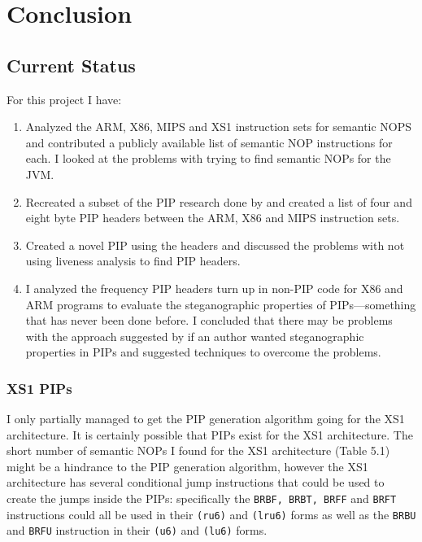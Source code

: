 \documentclass[10pt,]{book}
\begin{document}
\chapter{Conclusion}

\section{Current Status}

For this project I have:

\begin{enumerate}[1.]
\item
  Analyzed the ARM, X86, MIPS and XS1 instruction sets for semantic NOPS
  and contributed a publicly available list of semantic NOP instructions
  for each. I looked at the problems with trying to find semantic NOPs
  for the JVM.
\item
  Recreated a subset of the PIP research done by \autocite{Cha:2010uh}
  and created a list of four and eight byte PIP headers between the ARM,
  X86 and MIPS instruction sets.
\item
  Created a novel PIP using the headers and discussed the problems with
  not using liveness analysis to find PIP headers.
\item
  I analyzed the frequency PIP headers turn up in non-PIP code for X86
  and ARM programs to evaluate the steganographic properties of
  PIPs---something that has never been done before. I concluded that
  there may be problems with the approach suggested by
  \autocite{Cha:2010uh} if an author wanted steganographic properties in
  PIPs and suggested techniques to overcome the problems.
\end{enumerate}
\subsection{XS1 PIPs}

I only partially managed to get the PIP generation algorithm going for
the XS1 architecture. It is certainly possible that PIPs exist for the
XS1 architecture. The short number of semantic NOPs I found for the XS1
architecture (Table 5.1) might be a hindrance to the PIP generation
algorithm, however the XS1 architecture has several conditional jump
instructions that could be used to create the jumps inside the PIPs:
specifically the \lstinline!BRBF, BRBT, BRFF! and \lstinline!BRFT!
instructions could all be used in their \lstinline!(ru6)! and
\lstinline!(lru6)! forms as well as the \lstinline!BRBU! and
\lstinline!BRFU! instruction in their \lstinline!(u6)! and
\lstinline!(lu6)! forms\autocite{May:ua}.
\end{document}
